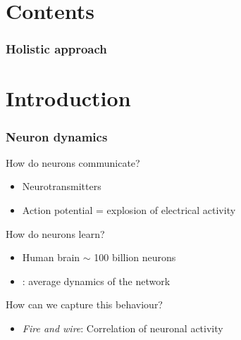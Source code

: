 
\section{Contents}
\begin{frame}
\frametitle{Holistic approach}
\begin{figure}[H]
\centering
{}
\end{figure}
\end{frame}


\section{Introduction}
\begin{frame}
\frametitle{Neuron dynamics}
How do neurons communicate?
\begin{itemize}
\item Neurotransmitters \\
\item Action potential = explosion of electrical activity \\ [0.5cm]
\end{itemize}
How do neurons learn?
\begin{itemize}
\item Human brain $\sim$ 100 billion neurons \\
\item \MFR: average dynamics of the network \\ [0.5cm]
\end{itemize}
How can we capture this behaviour?
\begin{itemize}
\item \textsl{Fire and wire}: Correlation of neuronal activity \\
\end{itemize}
\end{frame}



